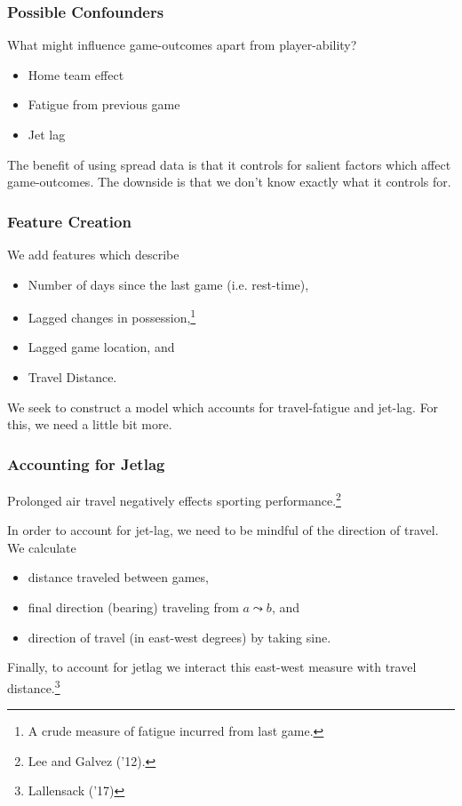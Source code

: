 \documentclass{beamer}
\begin{document}
\begin{frame}   
  \frametitle{Possible Confounders}
  What might influence game-outcomes apart from player-ability?

  \vspace{12pt}\begin{itemize}     
    \item Home team effect
    \item Fatigue from previous game
    \item Jet lag   
    \end{itemize}

  \vspace{12pt}The benefit of using spread data is that it controls for salient factors which affect game-outcomes.
  The downside is that we don't know exactly what it controls for. \end{frame}

\begin{frame}   \frametitle{Feature Creation}
  We add features which describe
  \vspace{12pt}  
  \begin{itemize}     
    \item Number of days since the last game (i.e. rest-time),
    \item Lagged changes in possession,\footnote{A crude measure of fatigue incurred from last game.}
    \item Lagged game location, and
    \item Travel Distance.   
  \end{itemize}
  \vspace{12pt}We seek to construct a model which accounts for travel-fatigue and jet-lag.
  For this, we need a little bit more. \end{frame}

\begin{frame}   \frametitle{Accounting for Jetlag}
  Prolonged air travel negatively effects sporting performance.\footnote{Lee and Galvez ('12).}

  \vspace{12pt}In order to account for jet-lag, we need to be mindful of the direction of travel. We calculate
  \vspace{12pt}\begin{itemize}     \item distance traveled between games,
    \item final direction (bearing) traveling from $a \leadsto b$, and
    \item direction of travel (in east-west degrees) by taking sine.
  \end{itemize}
  \vspace{12pt}Finally, to account for jetlag we interact this east-west measure with travel distance.\footnote{Lallensack ('17)} \end{frame}
\end{document}
